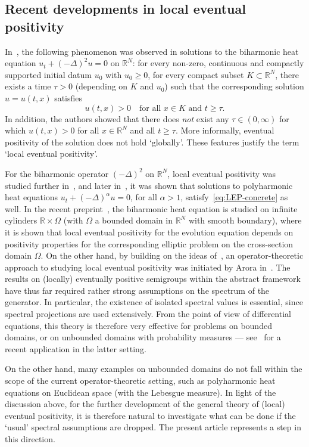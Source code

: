 \documentclass[a4paper, reqno]{amsart}
\numberwithin{equation}{section}
\theoremstyle{plain}
\theoremstyle{definition}
\theoremstyle{remark}
\newcommand{\RR}{\mathbb{R}}
\begin{document}
\subsection*{Recent developments in local eventual positivity}
\label{sec:LEP-background}
In~\cite{GG-lep}, the following phenomenon was observed in solutions to the biharmonic heat equation $u_t + (-\Delta)^2 u=0$ on $\RR^N$: for every non-zero, continuous and compactly supported initial datum $u_0$ with $u_0\ge 0$, for every compact subset $K\subset\RR^N$, there exists a time $\tau>0$ (depending on $K$ and $u_0$) such that the corresponding solution $u=u(t,x)$ satisfies
\begin{equation}
	\label{eq:LEP-concrete}
	u(t,x) > 0 \quad\text{for all } x \in K\text{ and } t\ge\tau.
\end{equation}
In addition, the authors showed that there does \emph{not} exist any $\tau\in (0,\infty)$ for which $u(t,x)>0$ for all $x\in\RR^N$ and all $t\ge\tau$. More informally, eventual positivity of the solution does not hold `globally'. These features justify the term `local eventual positivity'.

For the biharmonic operator $(-\Delta)^2$ on $\RR^N$, local eventual positivity was studied further in~\cite{FGG}, and later in~\cite{FF-lep}, it was shown that solutions to polyharmonic heat equations $u_t + (-\Delta)^\alpha u=0$, for all $\alpha>1$, satisfy~\eqref{eq:LEP-concrete} as well. In the recent preprint~\cite{DGM}, the biharmonic heat equation is studied on infinite cylinders $\RR\times\Omega$ (with $\Omega$ a bounded domain in $\RR^N$ with smooth boundary), where it is shown that local eventual positivity for the evolution equation depends on positivity properties for the corresponding elliptic problem on the cross-section domain $\Omega$. On the other hand, by building on the ideas of~\cite{DGK2,DG18}, an operator-theoretic approach to studying local eventual positivity was initiated by Arora in~\cite{Ar21}. The results on (locally) eventually positive semigroups within the abstract framework have thus far required rather strong assumptions on the spectrum of the generator. In particular, the existence of isolated spectral values is essential, since spectral projections are used extensively. From the point of view of differential equations, this theory is therefore very effective for problems on bounded domains, or on unbounded domains with probability measures --- see~\cite[Section 3.2]{AGRT} for a recent application in the latter setting. 

On the other hand, many examples on unbounded domains do not fall within the scope of the current operator-theoretic setting, such as polyharmonic heat equations on Euclidean space (with the Lebesgue measure). In light of the discussion above, for the further development of the general theory of (local) eventual positivity, it is therefore natural to investigate what can be done if the `usual' spectral assumptions are dropped. The present article represents a step in this direction.
\end{document}
